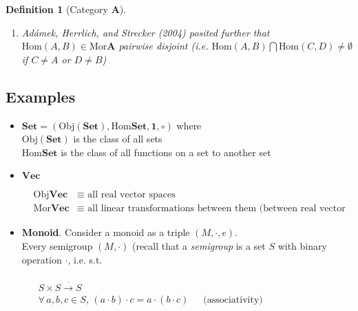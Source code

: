 \documentclass[10pt]{amsart}
\newtheorem{definition}{Definition}
\begin{document}
\begin{multicols*}{2}
\begin{definition}[Category $\mathbf{A}$]
\begin{enumerate}
\begin{enumerate}
		$\forall \, f \in \text{Hom}_{\mathbf{A}}(A,B)$,
		\[
		\begin{tikzpicture}
		\matrix (m) [matrix of math nodes, row sep=3em, column sep=4em, minimum width=2em]
		{
			A & B  \\
		};
		\path[->]
		(m-1-1) edge node [above] {$f$} (m-1-2)
		edge [loop left] node [left] {$1_A$} (m-1-1)
		(m-1-2) edge [loop right] node [right] {$1_B$} (m-1-2)
		;
		\end{tikzpicture}
		\]
		\item Ad\'{a}mek, Herrlich, and Strecker (2004) \cite{AHS2004} posited further that $\text{Hom}(A,B) \in \text{Mor}\mathbf{A}$ pairwise disjoint (i.e. $\text{Hom}(A,B) \bigcap \text{Hom}(C,D) \neq \emptyset$ if $C\neq A$ or $D\neq B$)
	\end{enumerate}
\end{enumerate}	
\end{definition}

\subsection{Examples}

\begin{itemize}
	\item $\textbf{Set} = (\text{Obj}{(\textbf{Set})}, \text{Hom}{\textbf{Set}},\mathbf{1},\circ)$ where \\
	$\text{Obj}{(\textbf{Set})}$ is the class of all sets \\
	$\text{Hom}{\textbf{Set}}$ is the class of all functions on a set to another set
	\item $\textbf{Vec}$
	
	\[
	\begin{aligned}
	& \text{Obj}\textbf{Vec} & \equiv \text{ all real vector spaces } \\ 
	& \text{Mor}\textbf{Vec} & \equiv \text{ all linear transformations between them (between real vector spaces) }
	\end{aligned}
	\]
	
	\item \textbf{Monoid}.  Consider a monoid as a triple $(M, \cdot, e)$.  \\
	Every semigroup $(M,\cdot)$ (recall that a \emph{semigroup} is a set $S$ with binary operation $\cdot $, i.e. s.t.
	
	\quad \,  $\begin{aligned} & \quad \\
	& S\times S \xrightarrow{\cdot } S \\ 
	& \forall \, a,b ,c \in S, \, (a\cdot b)\cdot c = a\cdot (b\cdot c) \quad \, \text{ (associativity) } \end{aligned}$ 
	

\end{itemize}
\end{multicols*}
\end{document}
